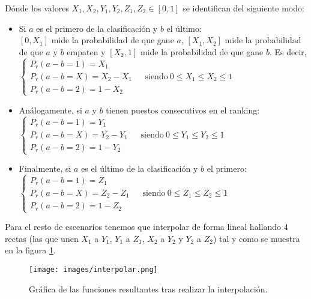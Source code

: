 Dónde los valores $X_{1},X_{2},Y_{1},Y_{2},Z_{1},Z_{2} \in [0,1]$ se identifican del siguiente modo:
\begin{itemize}
	\item Si $a$ es el primero de la clasificación y $b$ el último:\\
	 $[0,X_{1}]$ mide la probabilidad de que gane $a$, $[X_{1},X_{2}]$ mide la probabilidad de que $a$ y $b$ empaten y $[X_{2},1]$ mide la probabilidad de que gane $b$.
	 Es decir,\\
	 
	 $\begin{cases}
	 	P_{r}(a-b=1)=X_{1}\\
	 	P_{r}(a-b=X)=X_{2}-X_{1} \ \ \ \ \ \ \ \text{siendo} \ 0 \leq X_{1} \leq X_{2} \leq 1\\
	 	P_{r}(a-b=2)=1-X_{2} 
	 \end{cases}$\\
	 
	\item Análogamente, si $a$ y $b$ tienen puestos consecutivos en el ranking:\\
	
	$\begin{cases}
	P_{r}(a-b=1)=Y_{1}\\
	P_{r}(a-b=X)=Y_{2}-Y_{1} \ \ \ \ \ \ \ \text{siendo} \ 0 \leq Y_{1} \leq Y_{2} \leq 1\\
	P_{r}(a-b=2)=1-Y_{2} 
	\end{cases}$\\
	
	\item Finalmente, si $a$ es el último de la clasificación y $b$ el primero:\\
	
	$\begin{cases}
	P_{r}(a-b=1)=Z_{1}\\
	P_{r}(a-b=X)=Z_{2}-Z_{1} \ \ \ \ \ \ \ \text{siendo} \ 0 \leq Z_{1} \leq Z_{2} \leq 1\\
	P_{r}(a-b=2)=1-Z_{2} 
	\end{cases}$
\end{itemize}

Para el resto de escenarios tenemos que interpolar de forma lineal hallando 4 rectas (las que unen $X_{1}$ a $Y_{1}$, $Y_{1}$ a $Z_{1}$, $X_{2}$ a $Y_{2}$ y $Y_{2}$ a $Z_{2}$) tal y como se muestra en la figura \ref{fig:interpolar}.

\begin{figure}[htb]
	\centering
	\texttt{[image: images/interpolar.png]}
	\caption{Gráfica de las funciones resultantes tras realizar la interpolación.} \label{fig:interpolar}
\end{figure}

